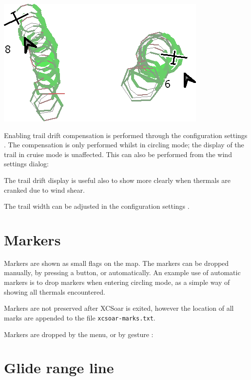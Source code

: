 \documentclass[a4paper,12pt]{refrep}
\begin{document}
\begin{center}
\includegraphics[angle=0,width=0.8\linewidth,keepaspectratio='true']{figures/traildrift.png}
\end{center}

Enabling trail drift compensation is performed through the
configuration settings .  The compensation is only performed
whilst in circling mode; the display of the trail in cruise mode is unaffected.
This can also be performed from the wind settings dialog:
\begin{quote}
\blink{}
\end{quote}

The trail drift display is useful also to show more clearly when thermals
are cranked due to wind shear.

The trail width can be adjusted in the configuration settings .

\section{Markers}

Markers are shown as small flags on the map.  The markers can be dropped
manually, by pressing a button, or automatically.  An example use of
automatic markers is to drop markers when entering circling mode, as a
simple way of showing all thermals encountered.

Markers are not preserved after XCSoar is exited, however the location
of all marks are appended to the file \verb|xcsoar-marks.txt|.

Markers are dropped by the menu, or by gesture : 
\begin{quote}
\blink{}
\end{quote}

\section{Glide range line}
\end{document}
